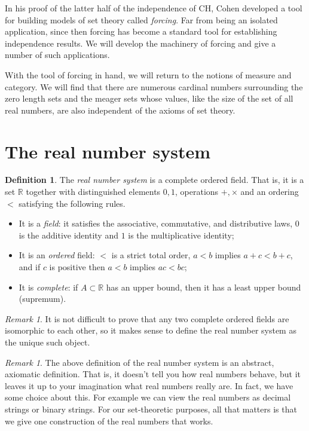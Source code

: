 \documentclass[11pt,oneside]{amsart}
\newcommand{\RR}{\mathbb R}
\theoremstyle{definition}
\theoremstyle{definition}
\newtheorem{defn}[thm]{Definition}
\theoremstyle{remark}
\newtheorem{rem}[thm]{Remark}
\begin{document}
In his proof of the latter half of the independence of CH, Cohen developed a tool for building models of set theory called \emph{forcing}. Far from being an isolated application, since then forcing has become a standard tool for establishing independence results. We will develop the machinery of forcing and give a number of such applications.

With the tool of forcing in hand, we will return to the notions of measure and category. We will find that there are numerous cardinal numbers surrounding the zero length sets and the meager sets whose values, like the size of the set of all real numbers, are also independent of the axioms of set theory.

\section{The real number system}

\begin{defn}
  The \emph{real number system} is a complete ordered field. That is, it is a set $\RR$ together with distinguished elements $0,1$, operations $+,\times$ and an ordering $<$ satisfying the following rules.
\begin{itemize}
\item It is a \emph{field}: it satisfies the associative, commutative, and distributive laws, $0$ is the additive identity and $1$ is the multiplicative identity;
\item It is an \emph{ordered} field: $<$ is a strict total order, $a<b$ implies $a+c<b+c$, and if $c$ is positive then $a<b$ implies $ac<bc$;
\item It is \emph{complete}: if $A\subset\RR$ has an upper bound, then it has a least upper bound (supremum).
\end{itemize}
\end{defn}

\begin{rem}
  It is not difficult to prove that any two complete ordered fields are isomorphic to each other, so it makes sense to define the real number system as the unique such object.
\end{rem}

\begin{rem}
  The above definition of the real number system is an abstract, axiomatic definition. That is, it doesn't tell you how real numbers behave, but it leaves it up to your imagination what real numbers really are. In fact, we have some choice about this. For example we can view the real numbers as decimal strings or binary strings. For our set-theoretic purposes, all that matters is that we give one construction of the real numbers that works.
\end{rem}
\end{document}
